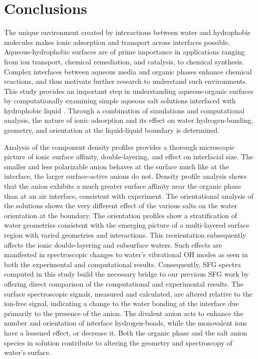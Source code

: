 \section{Conclusions}

The unique environment created by interactions between water and hydrophobic molecules makes ionic adsorption and transport across interfaces possible. Aqueous-hydrophobic surfaces are of prime importance in applications ranging from ion transport, chemical remediation, and catalysis, to chemical synthesis. Complex interfaces between aqueous media and organic phases enhance chemical reactions, and thus motivate further research to understand such environments. This study provides an important step in understanding aqueous-organic surfaces by computationally examining simple aqueous salt solutions interfaced with hydrophobic liquid \ctc. Through a combination of simulations and computational analysis, the nature of ionic adsorption and its effect on water hydrogen-bonding, geometry, and orientation at the liquid-liquid boundary is determined.

Analysis of the component density profiles provides a thorough microscopic picture of ionic surface affinity, double-layering, and effect on interfacial size. The smaller and less polarizable \cl anion behaves at the \ctcwat surface much like at the \airwat interface, the larger surface-active anions do not. Density profile analysis shows that the \nit anion exhibits a much greater surface affinity near the organic phase than at an air interface, consistent with experiment. The orientational analysis of the solutions shows the very different effect of the various salts on the water orientation at the \ctcwat boundary. The orientation profiles show a stratification of water geometries consistent with the emerging picture of a multi-layered surface region with varied geometries and interactions. This reorientation subsequently affects the ionic double-layering and subsurface waters. Such effects are manifested in spectroscopic changes to water's vibrational OH modes as seen in both the experimental and computational results. Consequently, SFG spectra computed in this study build the necessary bridge to our previous SFG work by offering direct comparison of the computational and experimental results. The surface spectroscopic signals, measured and calculated, are altered relative to the ion-free signal, indicating a change to the water bonding at the interface due primarily to the presence of the anion. The divalent \sul anion acts to enhance the number and orientation of interface hydrogen-bonds, while the monovalent ions have a lessened effect, or decrease it. Both the organic phase and the salt anion species in solution contribute to altering the geometry and spectroscopy of water's surface. 

